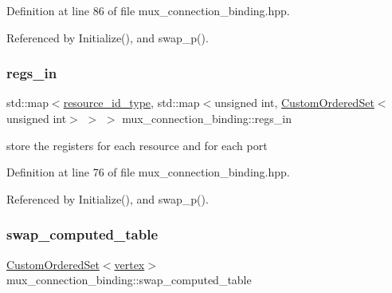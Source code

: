 Definition at line 86 of file mux\+\_\+connection\+\_\+binding.\+hpp.



Referenced by Initialize(), and swap\+\_\+p().

\mbox{\label{classmux__connection__binding_ae2887fd8b2a2ac2f821b88ee5b72645c}} 
\subsubsection{\texorpdfstring{regs\+\_\+in}{regs\_in}}
{\footnotesize\ttfamily std\+::map$<$\hyperlink{classmux__connection__binding_aa43c7eaf66a55ac97a5a7f57f6149025}{resource\+\_\+id\+\_\+type}, std\+::map$<$unsigned int, \hyperlink{classCustomOrderedSet}{Custom\+Ordered\+Set}$<$unsigned int$>$ $>$ $>$ mux\+\_\+connection\+\_\+binding\+::regs\+\_\+in\hspace{0.3cm}{\ttfamily [private]}}



store the registers for each resource and for each port 



Definition at line 76 of file mux\+\_\+connection\+\_\+binding.\+hpp.



Referenced by Initialize(), and swap\+\_\+p().

\mbox{\label{classmux__connection__binding_aca8cadda839b8ce1a7274ef6ec437603}} 
\subsubsection{\texorpdfstring{swap\+\_\+computed\+\_\+table}{swap\_computed\_table}}
{\footnotesize\ttfamily \hyperlink{classCustomOrderedSet}{Custom\+Ordered\+Set}$<$\hyperlink{graph_8hpp_abefdcf0544e601805af44eca032cca14}{vertex}$>$ mux\+\_\+connection\+\_\+binding\+::swap\+\_\+computed\+\_\+table\hspace{0.3cm}{\ttfamily [private]}}



